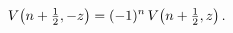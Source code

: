 \[\mathop{V\/}\nolimits\!\left(n+\tfrac{1}{2},-z\right)=(-1)^{n}\mathop{V\/}%
\nolimits\!\left(n+\tfrac{1}{2},z\right).\]